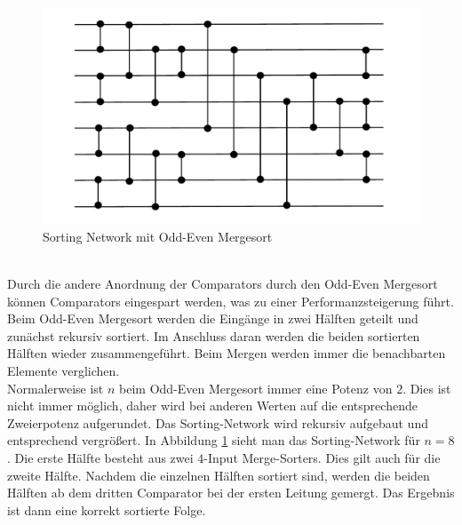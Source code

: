 \documentclass[a4,abstract=on]{scrartcl}
\begin{document}
\begin{figure}[H]
\centering
\includegraphics[width=\textwidth]{sorting_network_odd_even.pdf}
\caption{Sorting Network mit Odd-Even Mergesort}
\label{fig:odd-even-mergesort}
\end{figure}
\ \\
Durch die andere Anordnung der Comparators durch den Odd-Even Mergesort können Comparators eingespart werden, was zu einer Performanzsteigerung führt. Beim Odd-Even Mergesort werden die Eingänge in zwei Hälften geteilt und zunächst rekursiv sortiert. Im Anschluss daran werden die beiden sortierten Hälften wieder zusammengeführt. Beim Mergen werden immer die benachbarten Elemente verglichen.\\
Normalerweise ist $n$ beim Odd-Even Mergesort immer eine Potenz von $2$. Dies ist nicht immer möglich, daher wird bei anderen Werten auf die entsprechende Zweierpotenz aufgerundet. Das Sorting-Network wird rekursiv aufgebaut und entsprechend vergrößert. In Abbildung \ref{fig:odd-even-mergesort} sieht man das Sorting-Network für $n=8$. Die erste Hälfte besteht aus zwei $4$-Input Merge-Sorters. Dies gilt auch für die zweite Hälfte. Nachdem die einzelnen Hälften sortiert sind, werden die beiden Hälften ab dem dritten Comparator bei der ersten Leitung gemergt. Das Ergebnis ist dann eine korrekt sortierte Folge.

\end{document}
